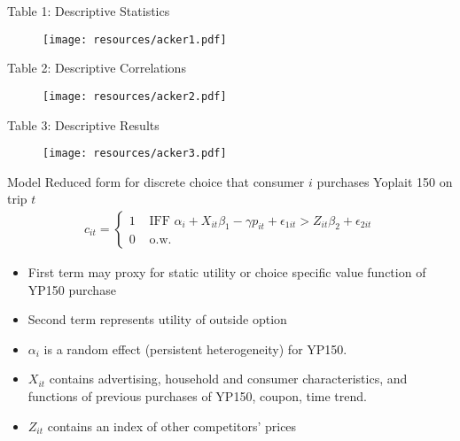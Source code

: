 \begin{frame}{Table 1: Descriptive Statistics}
\begin{figure}[htbp]
\begin{center}
\texttt{[image: resources/acker1.pdf]}
\label{default}
\end{center}
\end{figure}
\end{frame}

\begin{frame}{Table 2: Descriptive Correlations}
\begin{figure}[htbp]
\begin{center}
\texttt{[image: resources/acker2.pdf]}
\label{default}
\end{center}
\end{figure}
\end{frame}

\begin{frame}{Table 3: Descriptive Results}
\begin{figure}[htbp]
\begin{center}
\texttt{[image: resources/acker3.pdf]}
\label{default}
\end{center}
\end{figure}
\end{frame}



\begin{frame}{Model}
Reduced form for discrete choice that consumer $i$ purchases Yoplait 150 on trip $t$
\begin{eqnarray*}
c_{it} = \begin{cases}
       1 & \mbox{ IFF } \alpha_i + X_{it} \beta_1 - \gamma p_{it} + \epsilon_{1it} > Z_{it} \beta_2 + \epsilon_{2it}\\
       0 & \mbox{ o.w. } 
        \end{cases}
\end{eqnarray*}
\begin{itemize}
\item First term may \alert{proxy} for static utility or choice specific value function of YP150 purchase
\item Second term represents utility of outside option
\item $\alpha_i$ is a random effect (persistent heterogeneity) for YP150.
\item $X_{it}$ contains \alert{advertising}, household and consumer characteristics, and functions of previous purchases of YP150, coupon, time trend.
\item $Z_{it}$ contains an index of other competitors' prices
\end{itemize}
\end{frame}

